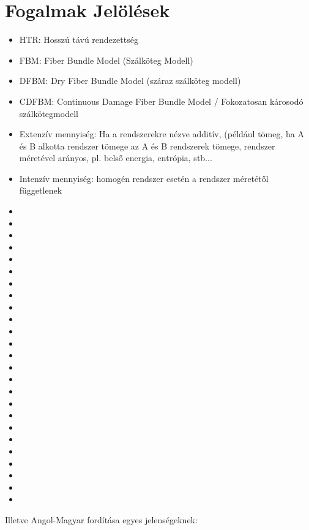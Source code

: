 \chapter*{Fogalmak Jelölések}
\label{chapt:fog}

\begin{itemize}
\item HTR: Hosszú távú rendezettség
\item FBM: Fiber Bundle Model (Szálköteg Modell)
\item DFBM: Dry Fiber Bundle Model (száraz szálköteg modell)
\item CDFBM: Continuous Damage Fiber Bundle Model / Fokozatosan károsodó szálkötegmodell
\item Extenzív mennyiség: Ha a rendszerekre nézve additív, (például tömeg, ha A és B alkotta rendszer tömege az A és B rendszerek tömege, rendszer méretével arányos, pl. belső energia, entrópia, stb...
\item Intenzív mennyiség: homogén rendszer esetén a rendszer méretétől függetlenek
\item 
\item
\item
\item
\item
\item
\item
\item
\item
\item
\item
\item
\item
\item
\item
\item
\item
\item
\item
\item
\item
\item
\item
\item
\item

\end{itemize}

Illetve Angol-Magyar fordítása egyes jelenségeknek:

